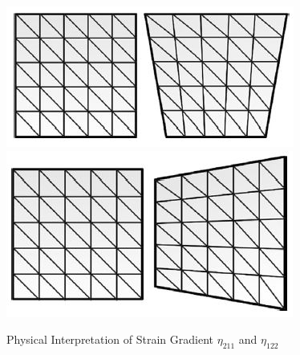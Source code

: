 \documentclass[12pt]{article}
\begin{document}
\begin{figure}[H]
	\begin{center}
		\includegraphics[scale=0.8]{U121_Eta_121.JPG}  \qquad \qquad
		\includegraphics[scale=0.8]{U212_Eta_212.JPG}
   	\caption{Physical Interpretation of Strain Gradient $\eta_{211}$ and $\eta_{122}$ \cite{lesivcar2017two}}
	\end{center}  
\end{figure}
\end{document}
